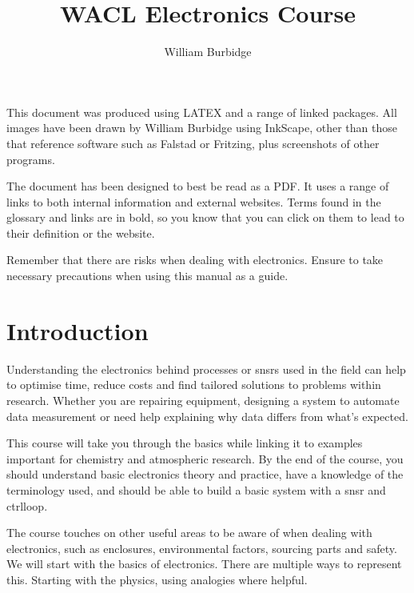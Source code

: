 \documentclass[a4paper,11pt]{report}
\title{WACL Electronics Course}
\author{William Burbidge}
\begin{document}
\maketitle

\tableofcontents

\vspace*{3\baselineskip}

This document was produced using LATEX and a range of linked packages. All images have been drawn by William Burbidge using InkScape, other than those that reference software such as Falstad or Fritzing, plus screenshots of other programs.

\vspace*{2\baselineskip}

The document has been designed to best be read as a PDF. It uses a range of links to both internal information and external websites. Terms found in the glossary and links are in bold, so you know that you can click on them to lead to their definition or the website.

\vspace*{2\baselineskip}

Remember that there are risks when dealing with electronics. Ensure to take necessary precautions when using this manual as a guide.

\doublespacing

\pagebreak

\section{Introduction}

Understanding the electronics behind processes or \gls{snsr}s used in the field can help to optimise time, reduce costs and find tailored solutions to problems within research. Whether you are repairing equipment, designing a system to automate data measurement or need help explaining why data differs from what's expected.

This course will take you through the basics while linking it to examples important for chemistry and atmospheric research. By the end of the course, you should understand basic electronics theory and practice, have a knowledge of the terminology used, and should be able to build a basic system with a \gls{snsr} and \gls{ctrlloop}.

The course touches on other useful areas to be aware of when dealing with electronics, such as enclosures, environmental factors, sourcing parts and safety. We will start with the basics of electronics. There are multiple ways to represent this. Starting with the physics, using analogies where helpful.
\end{document}
